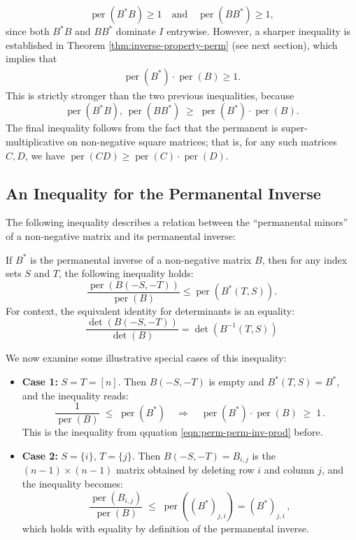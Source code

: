 \documentclass[11pt]{article}
\theoremstyle{definition}
\DeclareMathOperator{\per}{per}
\begin{document}
\begin{equation*}
    \per(B^*B) \geq 1 \quad \text{and} \quad \per(BB^*) \geq 1,
\end{equation*}
since both \( B^*B \) and \( BB^* \) dominate \( I \) entrywise. However, a sharper inequality is established in Theorem \ref{thm:inverse-property-perm} (see next section), which implies that
\begin{align}
	\label{eqn:perm-perm-inv-prod}
\per(B^*) \cdot \per(B) \geq 1.
\end{align}
This is strictly stronger than the two previous inequalities, because
\begin{equation*}
    \per(B^*B), \, \per(BB^*) \; \geq \; \per(B^*) \cdot \per(B).
\end{equation*}
The final inequality follows from the fact that the permanent is super-multiplicative on non-negative square matrices; that is, for any such matrices \( C, D \), we have \( \per(CD) \geq \per(C) \cdot \per(D) \).
\subsection{An Inequality for the Permanental Inverse}
The following inequality describes a relation between the ``permanental minors'' of a non-negative matrix and its permanental inverse: 
\begin{theorem}
		\label{thm:inverse-property-perm}
	If $B^*$ is the permanental inverse of a non-negative matrix $B$, then for any index sets $S$ and $T$, the following inequality holds:
	\begin{equation*}
		\frac{\per(B(-S,-T))}{\per(B)} \le \per(B^*(T,S)).
	\end{equation*}
	For context, the equivalent identity for determinants is an equality:
	\begin{equation*}
		\frac{\det(B(-S,-T))}{\det(B)} = \det(B^{-1}(T,S))
	\end{equation*}
\end{theorem}
We now examine some illustrative special cases of this inequality:
\begin{itemize}
	\item \textbf{Case 1:} \( S = T = [n] \). Then  \( B(-S, -T) \) is empty and \( B^*(T, S) =B^*\), and the inequality reads:
	\begin{equation*}
	    \frac{1}{\per(B)} \;\le\; \per(B^*) \quad \Longrightarrow \quad \per(B^*) \cdot \per(B) \;\ge\; 1\,.
	\end{equation*}
	This is the inequality from qquation \ref{eqn:perm-perm-inv-prod} before.
	\item \textbf{Case 2:} \( S = \{i\} \), \( T = \{j\} \). Then \( B(-S,-T) =B_{i,j}\) is the \( (n-1)\times(n-1) \) matrix obtained by deleting row \( i \) and column \( j \), and the inequality becomes:
	\begin{equation*}
	    \frac{\per(B_{i,j})}{\per(B)} \;\le\; \per((B^*)_{j,i})=(B^*)_{j,i}\,,
	\end{equation*}
	which holds with equality by definition of the permanental inverse.
\end{itemize}
\end{document}
